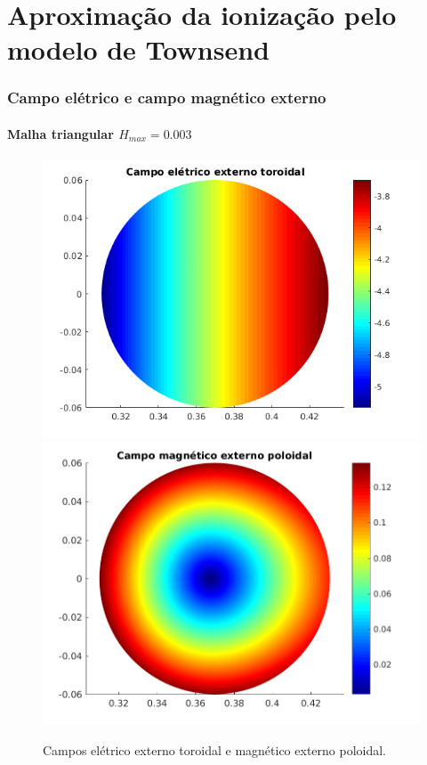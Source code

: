 \documentclass[aspectratio=169]{beamer}
\begin{document}
\section{Aproximação da ionização pelo modelo de Townsend}
   \begin{frame}
			\frametitle{Campo elétrico e campo magnético externo}
		\framesubtitle{Malha triangular $H_{max}=0.003$}
\begin{figure}[H]
\begin{center}
\includegraphics[scale=0.5]{../SImulacao_breakdown/PDE/Campoeleext.png} 
\includegraphics[scale=0.5]{../SImulacao_breakdown/PDE/CampoMagext2.png}
 \caption{Campos elétrico externo toroidal e magnético externo poloidal.}
\end{center}
\end{figure}
\end{frame}	
\end{document}
